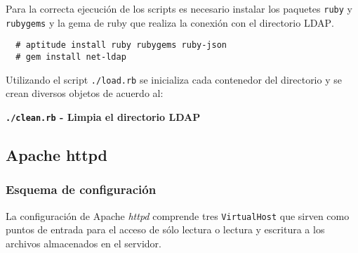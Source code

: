 Para la correcta ejecuci\'{o}n de los scripts es necesario instalar los paquetes \texttt{ruby} y \texttt{rubygems} y la gema de ruby que realiza la conexi\'{o}n con el directorio \textsc{LDAP}.

{
\scriptsize
\linespread{1}
\begin{verbatim}
  # aptitude install ruby rubygems ruby-json
  # gem install net-ldap
\end{verbatim}
}

Utilizando el script \texttt{./load.rb} se inicializa cada contenedor del directorio y se crean diversos objetos de acuerdo al:

{
\begin{table}[H]
\caption{Script de carga de objetos en el directorio}{}
\label{tab:load-rb}
\noindent{} %
\end{table}
}

\textbf{\texttt{./clean.rb} - Limpia el directorio LDAP}

      \subsection {Apache httpd}

        \subsubsection {Esquema de configuraci\'{o}n}

La configuraci\'{o}n de Apache \textit{httpd} comprende tres \texttt{VirtualHost} que sirven como puntos de entrada para el acceso de s\'{o}lo lectura o lectura y escritura a los archivos almacenados en el servidor.

{
\begin{table}[H]
\caption{VirtualHost configurados en Apache HTTPD}{}
\label{tab:virtualhost}
\noindent{} %
\end{table}
}

